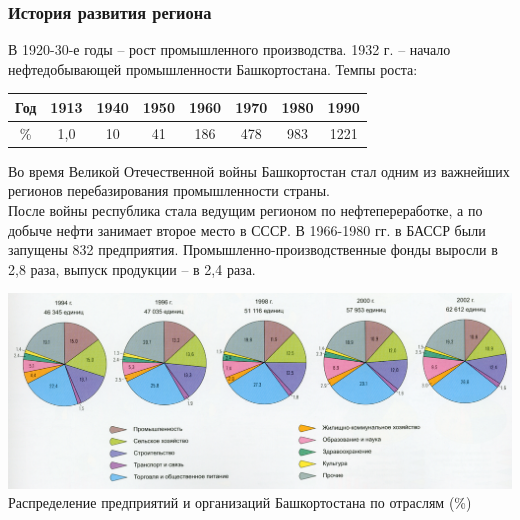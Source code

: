 \begin{frame}
\frametitle{История развития региона}

В 1920-30-е годы -- рост промышленного производства. 1932 г. -- начало нефтедобывающей промышленности Башкортостана. Темпы роста:
\begin{center}
\begin{tabular}{|c|c|c|c|c|c|c|c|}
\hline 
Год & 1913 & 1940 & 1950 & 1960 & 1970 & 1980 & 1990 \\ 
\hline 
\% & 1,0 & 10 & 41 & 186 & 478 & 983 & 1221 \\ 
\hline 
\end{tabular} 
\end{center}

Во время Великой Отечественной войны Башкортостан стал одним из важнейших регионов перебазирования промышленности страны.\\[5pt]

После войны республика стала ведущим регионом по нефтепереработке, а по добыче нефти занимает второе место в СССР. В 1966-1980 гг. в БАССР были запущены 832 предприятия. Промышленно-производственные фонды выросли в 2,8 раза, выпуск продукции – в 2,4 раза. 

\includegraphics[width=1\linewidth]{pics/sasha/industries}
Распределение предприятий и организаций Башкортостана по отраслям (\%)

\end{frame}

